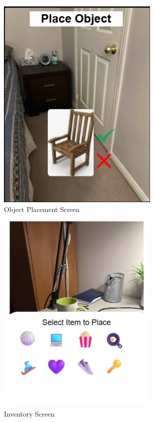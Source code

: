 \documentclass[12pt, titlepage]{article}
\begin{document}
\begin{figure}[H]
\centering
\includegraphics[width=0.7\textwidth]{OPScreen.png}
\caption{Object Placement Screen}
\label{FigOP}
\end{figure}

\begin{figure}[H]
\centering
\includegraphics[width=0.7\textwidth]{IScreen.png}
\caption{Inventory Screen}
\label{FigI}
\end{figure}
\end{document}
